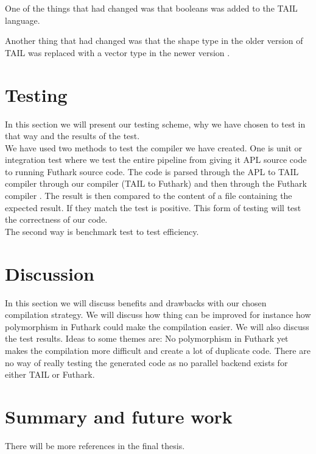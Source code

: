 \documentclass[11pt]{article}
\begin{document}
One of the things that had changed was that booleans was added to the TAIL language. %

Another thing that had changed was that the shape type in the older version of TAIL was replaced with a vector type in the newer version \cite{ElsmanDybdal:Array:2014}.\\

\section{Testing}
In this section we will present our testing scheme, why we have chosen to test in that way and the results of the test.\\

We have used two methods to test the compiler we have created.
One is unit or integration test where we test the entire pipeline from giving it APL source code to running Futhark source code.
The code is parsed through the APL to TAIL compiler \cite{ElsmanDybdal:Array:2014}
through our compiler (TAIL to Futhark) and then through the Futhark compiler \cite{TroelsHenriksen}.
The result is then compared to the content of a file containing the expected result.
If they match the test is positive. This form of testing will test the correctness of our code. \\

The second way is benchmark test to test efficiency. 


\section{Discussion}
In this section we will discuss benefits and drawbacks with our chosen compilation strategy.
We will discuss how thing can be improved for instance how polymorphism in Futhark could make the compilation easier.
We will also discuss the test results.
Ideas to some themes are: No polymorphism in Futhark yet makes the compilation more difficult and create a lot of duplicate code.
There are no way of really testing the generated code as no parallel backend exists for either TAIL or Futhark.

\section{Summary and future work}




{}


There will be more references in the final thesis. 
\end{document}
